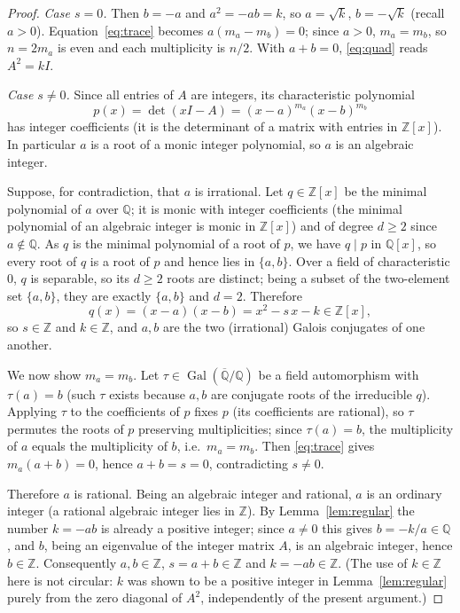 \documentclass{amsart}
\theoremstyle{definition}
\begin{document}
\begin{proof}
\emph{Case $s=0$.} Then $b=-a$ and $a^2=-ab=k$, so $a=\sqrt k$, $b=-\sqrt k$
(recall $a>0$). Equation~\eqref{eq:trace} becomes $a(m_a-m_b)=0$; since $a>0$,
$m_a=m_b$, so $n=2m_a$ is even and each multiplicity is $n/2$. With $a+b=0$,
\eqref{eq:quad} reads $A^2=kI$.

\emph{Case $s\ne0$.} Since all entries of $A$ are integers, its characteristic
polynomial
\[
p(x)=\det(xI-A)=(x-a)^{m_a}(x-b)^{m_b}
\]
has integer coefficients (it is the determinant of a matrix with entries in
$\mathbb Z[x]$). In particular $a$ is a root of a monic integer polynomial, so
$a$ is an algebraic integer.

Suppose, for contradiction, that $a$ is irrational. Let $q\in\mathbb Z[x]$ be
the minimal polynomial of $a$ over $\mathbb Q$; it is monic with integer
coefficients (the minimal polynomial of an algebraic integer is monic in
$\mathbb Z[x]$) and of degree $d\ge2$ since $a\notin\mathbb Q$. As $q$ is the
minimal polynomial of a root of $p$, we have $q\mid p$ in $\mathbb Q[x]$, so
every root of $q$ is a root of $p$ and hence lies in $\{a,b\}$. Over a field of
characteristic $0$, $q$ is separable, so its $d\ge2$ roots are distinct; being
a subset of the two-element set $\{a,b\}$, they are exactly $\{a,b\}$ and
$d=2$. Therefore
\[
q(x)=(x-a)(x-b)=x^2-s\,x-k\in\mathbb Z[x],
\]
so $s\in\mathbb Z$ and $k\in\mathbb Z$, and $a,b$ are the two (irrational)
Galois conjugates of one another.

We now show $m_a=m_b$. Let $\tau\in\operatorname{Gal}(\overline{\mathbb
Q}/\mathbb Q)$ be a field automorphism with $\tau(a)=b$ (such $\tau$ exists
because $a,b$ are conjugate roots of the irreducible $q$). Applying $\tau$ to
the coefficients of $p$ fixes $p$ (its coefficients are rational), so
$\tau$ permutes the roots of $p$ preserving multiplicities; since
$\tau(a)=b$, the multiplicity of $a$ equals the multiplicity of $b$, i.e.\
$m_a=m_b$. Then \eqref{eq:trace} gives $m_a(a+b)=0$, hence $a+b=s=0$,
contradicting $s\ne0$.

Therefore $a$ is rational. Being an algebraic integer and rational, $a$ is an
ordinary integer (a rational algebraic integer lies in $\mathbb Z$). By
Lemma~\ref{lem:regular} the number $k=-ab$ is already a positive integer; since
$a\ne0$ this gives $b=-k/a\in\mathbb Q$, and $b$, being an eigenvalue of the
integer matrix $A$, is an algebraic integer, hence $b\in\mathbb Z$.
Consequently $a,b\in\mathbb Z$, $s=a+b\in\mathbb Z$ and $k=-ab\in\mathbb Z$.
(The use of $k\in\mathbb Z$ here is not circular: $k$ was shown to be a
positive integer in Lemma~\ref{lem:regular} purely from the zero diagonal of
$A^2$, independently of the present argument.)
\end{proof}
\end{document}
